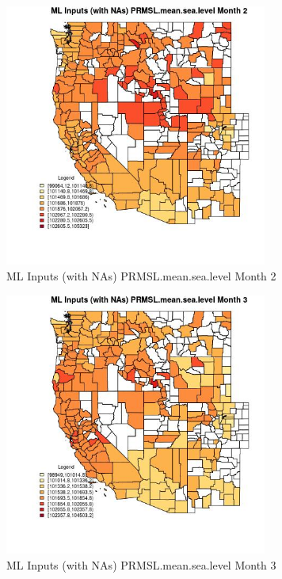\begin{figure} 
\centering  
\includegraphics[width=0.77\textwidth]{Code_Outputs/Report_ML_input_PM25_Step4_part_f_de_duplicated_aves_prioritize_24hr_obswNAs_CountyPRMSLmeansealevelmedianMonth2.jpg} 
\caption{\label{fig:Report_ML_input_PM25_Step4_part_f_de_duplicated_aves_prioritize_24hr_obswNAsCountyPRMSLmeansealevelmedianMonth2}ML Inputs (with NAs) PRMSL.mean.sea.level Month 2} 
\end{figure} 
 

\begin{figure} 
\centering  
\includegraphics[width=0.77\textwidth]{Code_Outputs/Report_ML_input_PM25_Step4_part_f_de_duplicated_aves_prioritize_24hr_obswNAs_CountyPRMSLmeansealevelmedianMonth3.jpg} 
\caption{\label{fig:Report_ML_input_PM25_Step4_part_f_de_duplicated_aves_prioritize_24hr_obswNAsCountyPRMSLmeansealevelmedianMonth3}ML Inputs (with NAs) PRMSL.mean.sea.level Month 3} 
\end{figure} 
 

